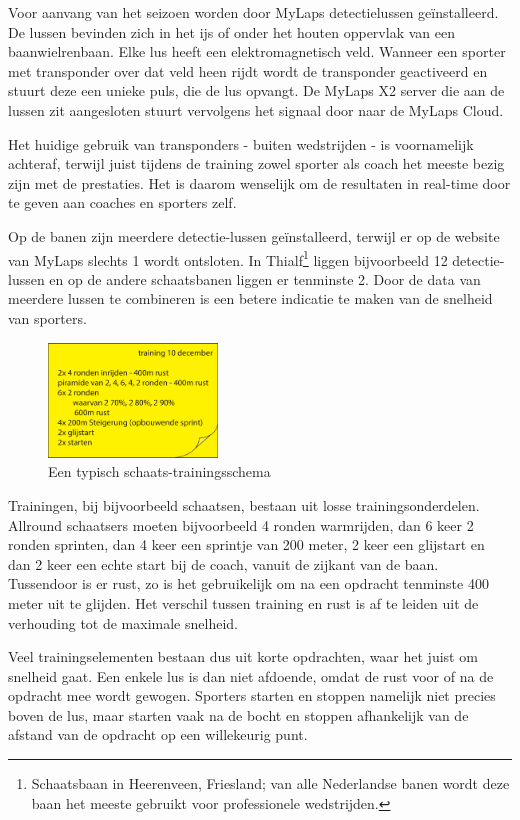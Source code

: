 Voor aanvang van het seizoen worden door MyLaps detectielussen geïnstalleerd. De lussen bevinden zich in het ijs of onder het houten oppervlak van een baanwielrenbaan. Elke lus heeft een elektromagnetisch veld. Wanneer een sporter met transponder over dat veld heen rijdt wordt de transponder geactiveerd en stuurt deze een unieke puls, die de lus opvangt. De MyLaps X2 server die aan de lussen zit aangesloten stuurt vervolgens het signaal door naar de MyLaps Cloud.

Het huidige gebruik van transponders - buiten wedstrijden - is voornamelijk achteraf, terwijl juist tijdens de training zowel sporter als coach het meeste bezig zijn met de prestaties. Het is daarom wenselijk om de resultaten in real-time door te geven aan coaches en sporters zelf.

Op de banen zijn meerdere detectie-lussen geïnstalleerd, terwijl er op de website van MyLaps slechts 1 wordt ontsloten. In Thialf\footnote{Schaatsbaan in Heerenveen, Friesland; van alle Nederlandse banen wordt deze baan het meeste gebruikt voor professionele wedstrijden.} liggen bijvoorbeeld 12 detectie-lussen en op de andere schaatsbanen liggen er tenminste 2. Door de data van meerdere lussen te combineren is een betere indicatie te maken van de snelheid van sporters.

\begin{figure}
 \includegraphics[width=0.4\textwidth]{style/images/training}
 \caption{Een typisch schaats-trainingsschema}
\end{figure}

Trainingen, bij bijvoorbeeld schaatsen, bestaan uit losse trainingsonderdelen. Allround schaatsers moeten bijvoorbeeld 4 ronden warmrijden, dan 6 keer 2 ronden sprinten, dan 4 keer een sprintje van 200 meter, 2 keer een glijstart en dan 2 keer een echte start bij de coach, vanuit de zijkant van de baan. Tussendoor is er rust, zo is het gebruikelijk om na een opdracht tenminste 400 meter uit te glijden. Het verschil tussen training en rust is af te leiden uit de verhouding tot de maximale snelheid.

Veel trainingselementen bestaan dus uit korte opdrachten, waar het juist om snelheid gaat. Een enkele lus is dan niet afdoende, omdat de rust voor of na de opdracht mee wordt gewogen. Sporters starten en stoppen namelijk niet precies boven de lus, maar starten vaak na de bocht en stoppen afhankelijk van de afstand van de opdracht op een willekeurig punt. 

